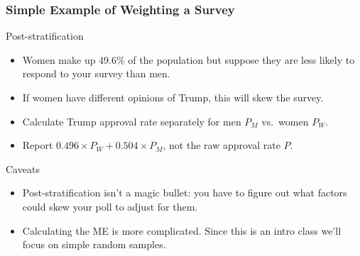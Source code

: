 \begin{frame}
  \frametitle{Simple Example of Weighting a Survey}

  \footnotesize
  \begin{block}{Post-stratification}
    \begin{itemize}
  \item Women make up 49.6\% of the population but suppose they are less likely to respond to your survey than men. 
  \item If women have different opinions of Trump, this will skew the survey.
  \item Calculate Trump approval rate separately for men $P_M$ vs.\ women $P_W$.
  \item Report $0.496 \times P_W +  0.504 \times P_M$, not the raw approval rate $P$.
\end{itemize}
  \end{block}

  \pause
    
  \begin{alertblock}{Caveats}
    \begin{itemize}
      \item Post-stratification isn't a magic bullet: you have to figure out what factors could skew your poll to adjust for them.
      \item Calculating the ME is more complicated. Since this is an intro class we'll focus on simple random samples.
    \end{itemize}
  \end{alertblock}

\end{frame}

